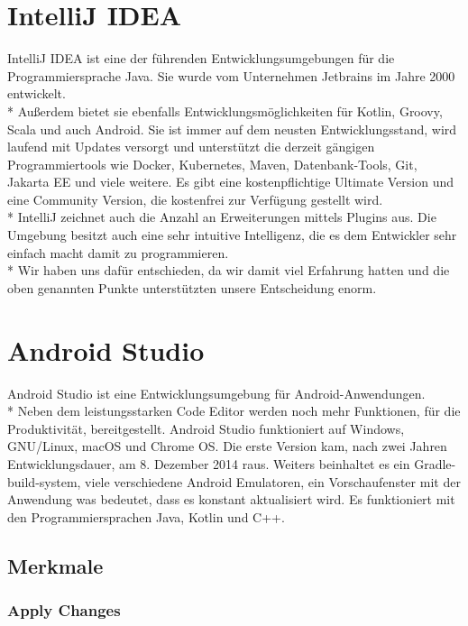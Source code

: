 \section{IntelliJ IDEA}
\author{Benjamin Besic}

IntelliJ IDEA ist eine der führenden Entwicklungsumgebungen für die Programmiersprache Java. Sie wurde vom Unternehmen Jetbrains im Jahre 2000 entwickelt.
\\* Außerdem bietet sie ebenfalls Entwicklungsmöglichkeiten für Kotlin, Groovy, Scala und auch Android.
 Sie ist immer auf dem neusten Entwicklungsstand, wird laufend mit Updates versorgt und unterstützt die derzeit gängigen Programmiertools
wie Docker, Kubernetes, Maven, Datenbank-Tools, Git, Jakarta EE und viele weitere.
Es gibt eine kostenpflichtige Ultimate Version und eine Community Version, die kostenfrei zur Verfügung gestellt wird.
\\* IntelliJ zeichnet auch die Anzahl an Erweiterungen mittels Plugins aus. Die Umgebung besitzt auch eine
sehr intuitive Intelligenz, die es dem Entwickler sehr einfach macht damit zu programmieren.
\cite{IntJ} \\*
Wir haben uns dafür entschieden, da wir damit viel Erfahrung hatten und die oben genannten Punkte
unterstützten unsere Entscheidung enorm.

\section{Android Studio}
\author{Bozidar Spasenovic}
Android Studio ist eine Entwicklungsumgebung für Android-Anwendungen.
\\* 
Neben dem leistungsstarken Code Editor werden noch mehr Funktionen, für die Produktivität, bereitgestellt. 
Android Studio funktioniert auf Windows, GNU/Linux, macOS und Chrome OS. Die erste Version kam, nach zwei Jahren Entwicklungsdauer, am 8. Dezember 2014 raus.
Weiters beinhaltet es ein Gradle-build-system, viele verschiedene Android Emulatoren, ein Vorschaufenster mit der Anwendung was bedeutet, dass es konstant aktualisiert wird. 
Es funktioniert mit den Programmiersprachen Java, Kotlin und C++. 

\subsection{Merkmale}

\subsubsection{Apply Changes}

